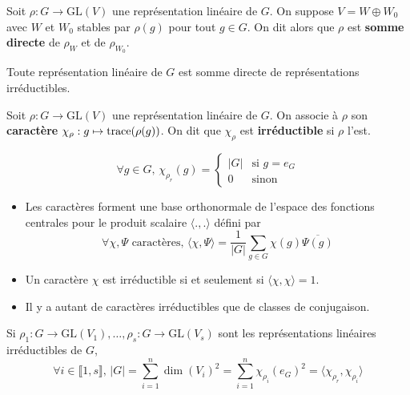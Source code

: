 	\begin{definition}
		Soit $\rho : G \rightarrow \mathrm{GL}(V)$ une représentation linéaire de $G$. On suppose $V = W \oplus W_0$ avec $W$ et $W_0$ stables par $\rho(g)$ pour tout $g \in G$. On dit alors que $\rho$ est \textbf{somme directe} de $\rho_W$ et de $\rho_{W_0}$.
	\end{definition}

	\begin{theorem}[Maschke]
		Toute représentation linéaire de $G$ est somme directe de représentations irréductibles.
	\end{theorem}


	\begin{definition}
		Soit $\rho : G \rightarrow \mathrm{GL}(V)$ une représentation linéaire de $G$. On associe à $\rho$ son \textbf{caractère} $\chi_\rho : g \mapsto \operatorname{trace}(\rho(g))$. On dit que $\chi_{\rho}$ est \textbf{irréductible} si $\rho$ l'est.
	\end{definition}

	
	\begin{example}
		\[ \forall g \in G, \, \chi_{\rho_r}(g) = \begin{cases} |G| &\text{si } g = e_G \\ 0 &\text{sinon} \end{cases} \]
	\end{example}


	\begin{theorem}
		\begin{itemize}
			\item Les caractères forment une base orthonormale de l'espace des fonctions centrales pour le produit scalaire $\langle ., . \rangle$ défini par
			\[ \forall \chi, \Psi \text{ caractères}, \, \langle \chi, \Psi \rangle = \frac{1}{|G|} \sum_{g \in G} \chi(g) \overline{\Psi(g)} \]
			\item Un caractère $\chi$ est irréductible si et seulement si $\langle \chi, \chi \rangle = 1$.
			\item Il y a autant de caractères irréductibles que de classes de conjugaison.
		\end{itemize}
	\end{theorem}

	\begin{theorem}
		Si $\rho_1 : G \rightarrow \mathrm{GL}(V_1), \dots, \rho_s : G \rightarrow \mathrm{GL}(V_s)$ sont les représentations linéaires irréductibles de $G$,
		\[ \forall i \in \llbracket 1, s \rrbracket, \, |G| = \sum_{i=1}^n \dim(V_i)^2 = \sum_{i=1}^n \chi_{\rho_i}(e_G)^2 = \langle \chi_{\rho_r}, \chi_{\rho_i} \rangle \]
	\end{theorem}

